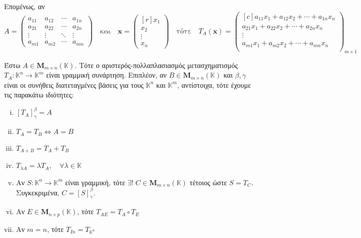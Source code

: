 Επομένως, αν 
\[
  A = 
  \begin{pmatrix}
    a_{11} & a_{12} & \cdots & a_{1n} \\
    a_{21} & a_{22} & \cdots & a_{2n} \\
    \vdots & \vdots & \ddots & \vdots \\
    a_{m1} & a_{m2} & \cdots & a_{mn} 
  \end{pmatrix} \quad \text{και} \quad \mathbf{x} = 
  \begin{pmatrix*}[r] x_{1} \\ x_{2} \\ \vdots \\ x_{n} \end{pmatrix*}
  \quad \text{τότε} \quad T_{A}(\mathbf{x}) = 
  \begin{pmatrix*}[c]
    a_{11} x_{1} + a_{12} x_{2} + \cdots + a_{1n}x_{n} \\
    a_{21} x_{1} + a_{22} x_{2} + \cdots + a_{2n}x_{n} \\ 
    \vdots \\
    a_{m1} x_{1} + a_{m2} x_{2} + \cdots + a_{mn}x_{n} \\ 
  \end{pmatrix*}_{m \times 1}
 \] 

 \begin{thm}
   Έστω $ A \in \textbf{M}_{m \times n}(\mathbb{K}) $. Τότε ο αριστερός-πολλαπλασιασμός
   μετασχηματισμός $ T_{A} \colon \mathbb{K}^{n} \to \mathbb{K}^{m} $ είναι γραμμική 
   συνάρτηση. Επιπλέον, αν $ B \in \textbf{M}_{m \times n}(\mathbb{K}) $ και $ \beta ,
   \gamma $ είναι οι συνήθεις διατεταγμένες βάσεις για τους $ \mathbb{K}^{n} $ και 
   $ \mathbb{K}^{m} $, αντίστοιχα, τότε έχουμε τις παρακάτω ιδιότητες:
   \begin{enumerate}[i)]
     \item $ [T_{A}]_{\gamma}^{\beta} = A $
     \item $ T_{A} = T_{B} \Leftrightarrow A = B $ 
     \item $ T_{A+B} = T_{A} + T_{B} $
     \item $ T_{\lambda A} = \lambda T_{A}, \quad \forall \lambda \in \mathbb{K} $
     \item Αν $ S \colon \mathbb{K}^{n} \to \mathbb{K}^{m} $ είναι γραμμική, τότε 
       $ \exists ! \; C \in \textbf{M}_{m \times n}(\mathbb{K}) $ τέτοιος ώστε 
       $ S=T_{C} $.  Συγκεκριμένα, $ C = [S]_{\gamma}^{\beta} $.
     \item Αν $ E \in \textbf{M}_{n \times p}(\mathbb{K}) $, τότε $ T_{AE} = T_{A} 
       \circ T_{E} $ 
     \item Αν $ m=n $, τότε $ T_{I{n}} = T_{\mathbb{K}^{n}} $
   \end{enumerate}
 \end{thm}

